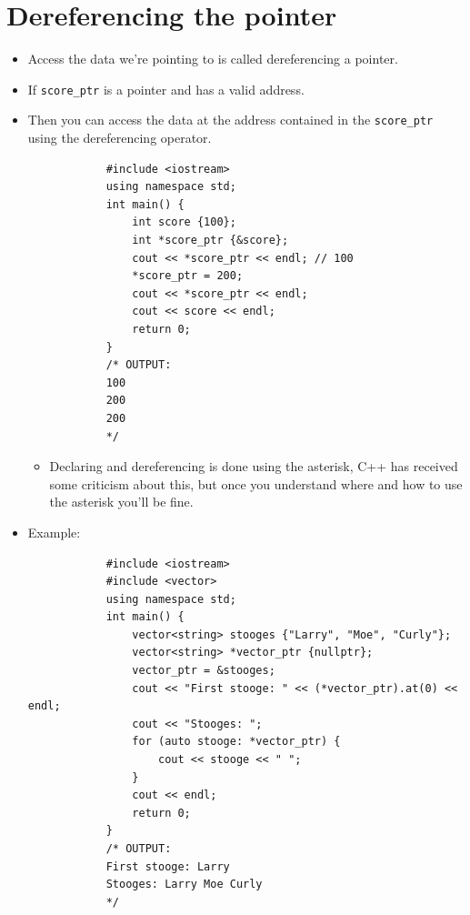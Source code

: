 \section{Dereferencing the pointer}
\begin{itemize}
    \item Access the data we're pointing to is called dereferencing a pointer.
    \item If \verb|score_ptr| is a pointer and has a valid address.
    \item Then you can access the data at the address contained in the \verb|score_ptr| using the dereferencing operator.
        \begin{verbatim}
            #include <iostream>
            using namespace std;
            int main() {
                int score {100};
                int *score_ptr {&score};
                cout << *score_ptr << endl; // 100
                *score_ptr = 200;
                cout << *score_ptr << endl;
                cout << score << endl;
                return 0;
            }
            /* OUTPUT:
            100
            200
            200
            */
        \end{verbatim}
        \begin{itemize}
            \item Declaring and dereferencing is done using the asterisk, C++ has received some criticism about this, but once you understand where and how to use the asterisk you'll be fine.
        \end{itemize}

    
    \item Example:
        \begin{verbatim}
            #include <iostream>
            #include <vector>
            using namespace std;
            int main() {
                vector<string> stooges {"Larry", "Moe", "Curly"};
                vector<string> *vector_ptr {nullptr};
                vector_ptr = &stooges;
                cout << "First stooge: " << (*vector_ptr).at(0) << endl;
                cout << "Stooges: ";
                for (auto stooge: *vector_ptr) {
                    cout << stooge << " ";
                }
                cout << endl;
                return 0;
            }
            /* OUTPUT:
            First stooge: Larry
            Stooges: Larry Moe Curly
            */
        \end{verbatim}
\end{itemize}


